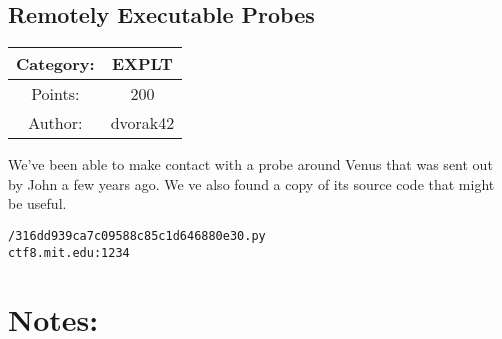 \begin{center}
\section*{Remotely Executable Probes}
{\large
\begin{tabular}{| c c |}
\hline
Category: & EXPLT\\\hline
Points: & 200\\\hline
Author: & dvorak42\\\hline
\end{tabular}
}
\end{center}
\vspace{0.5in}

{\large
We've been able to make contact with a probe around Venus that was sent out by John a few years ago. We
ve also found a copy of its source code that might be useful.
}
\vspace{0.25in}
\begin{center}
  {\Large\tt /316dd939ca7c09588c85c1d646880e30.py}\\
  {\Large\tt ctf8.mit.edu:1234}
\end{center}

\vspace{0.25in}
\section*{Notes:}
